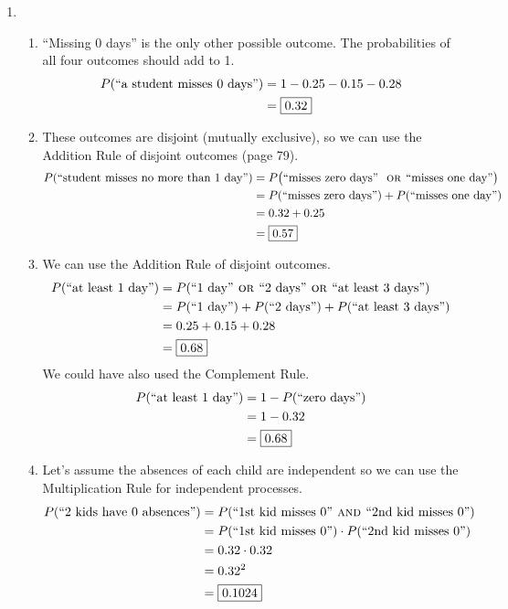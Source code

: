 \documentclass[12pt,letterpaper]{article}
\begin{document}
\begin{enumerate}
\item \begin{enumerate}
\item ``Missing 0 days'' is the only other possible outcome. The probabilities of all four outcomes should add to 1.
\begin{align*}
P(\text{``a student misses 0 days''}) &= 1-0.25-0.15-0.28\\
&= \fbox{0.32}
\end{align*}
\item These outcomes are disjoint (mutually exclusive), so we can use the Addition Rule of disjoint outcomes (page 79).
\begin{align*}
P(\text{``student misses no more than 1 day''}) &= P\big(\text{``misses zero days'' \textsc{~or~}``misses one day''}\big)\\
&= P(\text{``misses zero days''}) + P(\text{``misses one day''})\\
&= 0.32+0.25\\
&= \fbox{0.57}
\end{align*}
\item We can use the Addition Rule of disjoint outcomes.
\begin{align*}
P(\text{``at least 1 day''}) &= P(\text{``1 day''} \textsc{~or~} \text{``2 days''}\textsc{~or~} \text{``at least 3 days''})\\
&= P(\text{``1 day''}) + P(\text{``2 days''})+P(\text{``at least 3 days''})\\
&= 0.25+0.15+0.28\\
&= \fbox{0.68}
\end{align*}
We could have also used the Complement Rule.
\begin{align*}
P(\text{``at least 1 day''}) &= 1 - P(\text{``zero days''})\\
&= 1-0.32\\
&= \fbox{0.68}
\end{align*}

\item Let's assume the absences of each child are independent so we can use the Multiplication Rule for independent processes.
\begin{align*}
P(\text{``2 kids have 0 absences''}) &= P(\text{``1st kid misses 0''}\textsc{~and~} \text{``2nd kid misses 0''})\\
&= P(\text{``1st kid misses 0''}) \cdot P(\text{``2nd kid misses 0''})\\
&= 0.32 \cdot 0.32\\
&= 0.32^2\\
&= \fbox{0.1024}
\end{align*}


\end{enumerate}
\end{enumerate}
\end{document}
